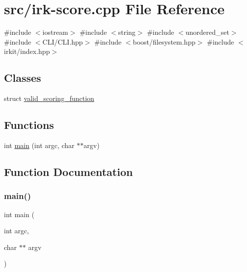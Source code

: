 \hypertarget{irk-score_8cpp}{}\section{src/irk-\/score.cpp File Reference}
\label{irk-score_8cpp}
{\ttfamily \#include $<$iostream$>$}\newline
{\ttfamily \#include $<$string$>$}\newline
{\ttfamily \#include $<$unordered\+\_\+set$>$}\newline
{\ttfamily \#include $<$C\+L\+I/\+C\+L\+I.\+hpp$>$}\newline
{\ttfamily \#include $<$boost/filesystem.\+hpp$>$}\newline
{\ttfamily \#include $<$irkit/index.\+hpp$>$}\newline
\subsection*{Classes}
\begin{DoxyCompactItemize}
\item 
struct \mbox{\hyperlink{structvalid__scoring__function}{valid\+\_\+scoring\+\_\+function}}
\end{DoxyCompactItemize}
\subsection*{Functions}
\begin{DoxyCompactItemize}
\item 
int \mbox{\hyperlink{irk-score_8cpp_a3c04138a5bfe5d72780bb7e82a18e627}{main}} (int argc, char $\ast$$\ast$argv)
\end{DoxyCompactItemize}


\subsection{Function Documentation}
\mbox{\label{irk-score_8cpp_a3c04138a5bfe5d72780bb7e82a18e627}} 
\subsubsection{\texorpdfstring{main()}{main()}}
{\footnotesize\ttfamily int main (\begin{DoxyParamCaption}\item[{int}]{argc,  }\item[{char $\ast$$\ast$}]{argv }\end{DoxyParamCaption})}

